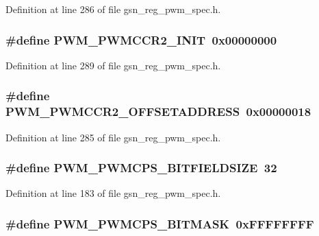 Definition at line 286 of file gsn\_\-reg\_\-pwm\_\-spec.h.

\hypertarget{a00565_a59f99ef8ebff5154854c39b9337ff48b}{
\subsubsection[{PWM\_\-PWMCCR2\_\-INIT}]{\setlength{\rightskip}{0pt plus 5cm}\#define PWM\_\-PWMCCR2\_\-INIT~0x00000000}}
\label{a00565_a59f99ef8ebff5154854c39b9337ff48b}


Definition at line 289 of file gsn\_\-reg\_\-pwm\_\-spec.h.

\hypertarget{a00565_ad5621eac4c6082f349e0870570ced3b8}{
\subsubsection[{PWM\_\-PWMCCR2\_\-OFFSETADDRESS}]{\setlength{\rightskip}{0pt plus 5cm}\#define PWM\_\-PWMCCR2\_\-OFFSETADDRESS~0x00000018}}
\label{a00565_ad5621eac4c6082f349e0870570ced3b8}


Definition at line 285 of file gsn\_\-reg\_\-pwm\_\-spec.h.

\hypertarget{a00565_aa4d129d4f2a6e8b93d85571952232483}{
\subsubsection[{PWM\_\-PWMCPS\_\-BITFIELDSIZE}]{\setlength{\rightskip}{0pt plus 5cm}\#define PWM\_\-PWMCPS\_\-BITFIELDSIZE~32}}
\label{a00565_aa4d129d4f2a6e8b93d85571952232483}


Definition at line 183 of file gsn\_\-reg\_\-pwm\_\-spec.h.

\hypertarget{a00565_a46fc28857838e93b502ee449c130598c}{
\subsubsection[{PWM\_\-PWMCPS\_\-BITMASK}]{\setlength{\rightskip}{0pt plus 5cm}\#define PWM\_\-PWMCPS\_\-BITMASK~0xFFFFFFFF}}
\label{a00565_a46fc28857838e93b502ee449c130598c}


